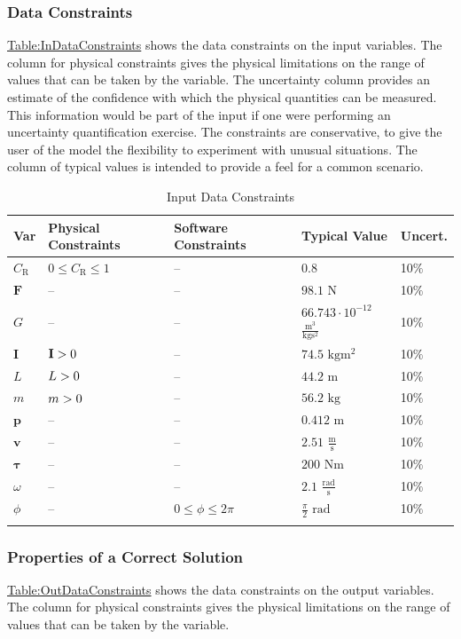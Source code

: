 \documentclass[12pt]{article}
\newcommand{\gt}{\ensuremath >}
\begin{document}
\subsubsection{Data Constraints}
\label{Sec:DataConstraints}
\hyperref[Table:InDataConstraints]{Table:InDataConstraints} shows the data constraints on the input variables. The column for physical constraints gives the physical limitations on the range of values that can be taken by the variable. The uncertainty column provides an estimate of the confidence with which the physical quantities can be measured. This information would be part of the input if one were performing an uncertainty quantification exercise. The constraints are conservative, to give the user of the model the flexibility to experiment with unusual situations. The column of typical values is intended to provide a feel for a common scenario.

\begin{longtable}{l l l l l}
\toprule
\textbf{Var} & \textbf{Physical Constraints} & \textbf{Software Constraints} & \textbf{Typical Value} & \textbf{Uncert.}
\\
\midrule
\endhead
${C_{\text{R}}}$ & $0\leq{}{C_{\text{R}}}\leq{}1$ & -- & $0.8$ & 10$\%$
\\
$\mathbf{F}$ & -- & -- & $98.1$ ${\text{N}}$ & 10$\%$
\\
$G$ & -- & -- & $66.743\cdot{}10^{-12}$ $\frac{\text{m}^{3}}{\text{kg}\text{s}^{2}}$ & 10$\%$
\\
$\mathbf{I}$ & $\mathbf{I}\gt{}0$ & -- & $74.5$ $\text{kg}\text{m}^{2}$ & 10$\%$
\\
$L$ & $L\gt{}0$ & -- & $44.2$ ${\text{m}}$ & 10$\%$
\\
$m$ & $m\gt{}0$ & -- & $56.2$ ${\text{kg}}$ & 10$\%$
\\
$\mathbf{p}$ & -- & -- & $0.412$ ${\text{m}}$ & 10$\%$
\\
$\mathbf{v}$ & -- & -- & $2.51$ $\frac{\text{m}}{\text{s}}$ & 10$\%$
\\
$\mathbf{τ}$ & -- & -- & $200$ $\text{N}\text{m}$ & 10$\%$
\\
$ω$ & -- & -- & $2.1$ $\frac{\text{rad}}{\text{s}}$ & 10$\%$
\\
$ϕ$ & -- & $0\leq{}ϕ\leq{}2 π$ & $\frac{π}{2}$ ${\text{rad}}$ & 10$\%$
\\
\bottomrule
\caption{Input Data Constraints}
\label{Table:InDataConstraints}
\end{longtable}
\subsubsection{Properties of a Correct Solution}
\label{Sec:CorSolProps}
\hyperref[Table:OutDataConstraints]{Table:OutDataConstraints} shows the data constraints on the output variables. The column for physical constraints gives the physical limitations on the range of values that can be taken by the variable.
\end{document}
